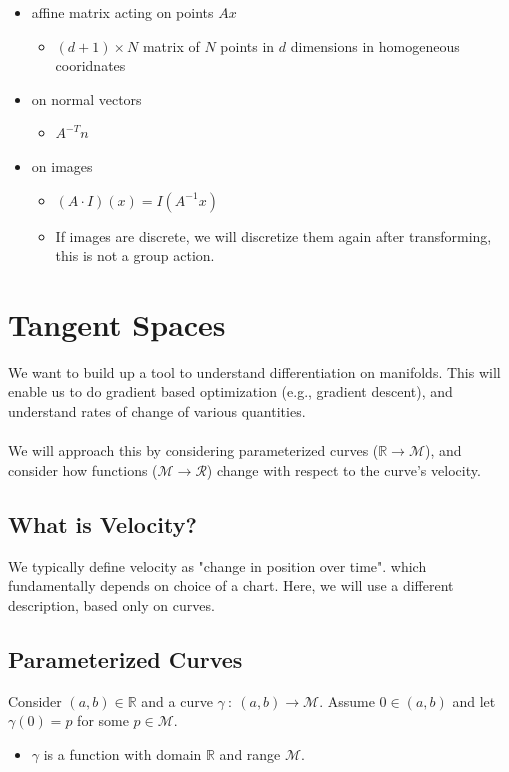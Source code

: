 \documentclass[10pt]{article}
\begin{document}
\begin{itemize}
    \item affine matrix acting on points  $Ax$
    \begin{itemize}
        \item $(d + 1) \times N$ matrix of $N$ points in $d$ dimensions in homogeneous cooridnates
    \end{itemize}
    \item on normal vectors
    \begin{itemize}
        \item $A^{-T} n$
    \end{itemize}
    \item on images
    \begin{itemize}
        \item $(A \cdot I)(x) = I(A^{-1}x)$
        \item If images are discrete, we will discretize them again after transforming, this is not a group action.
    \end{itemize}
\end{itemize}

\section*{Tangent Spaces}
We want to build up a tool to understand differentiation on manifolds.  This will enable us to do gradient based optimization (e.g., gradient descent), and understand rates of change of various quantities.\\\\
We will approach this by considering parameterized curves ($\mathbb{R} \rightarrow \mathcal{M}$), and consider how functions ($\mathcal{M} \rightarrow \mathcal{R}$) change with respect to the curve's velocity.

\subsection*{What is Velocity?}
We typically define velocity as "change in position over time". which fundamentally depends on choice of a chart.  Here, we will use a different description, based only on curves.

\subsection*{Parameterized Curves}
Consider $(a, b) \in \mathbb{R}$ and a curve $\gamma \::\: (a, b) \rightarrow \mathcal{M}$.  Assume $0 \in (a, b)$ and let $\gamma(0) = p$ for some $p \in \mathcal{M}$.
\begin{itemize}
    \item $\gamma$ is a function with domain $\mathbb{R}$ and range $\mathcal{M}$.
\end{itemize}
\end{document}
